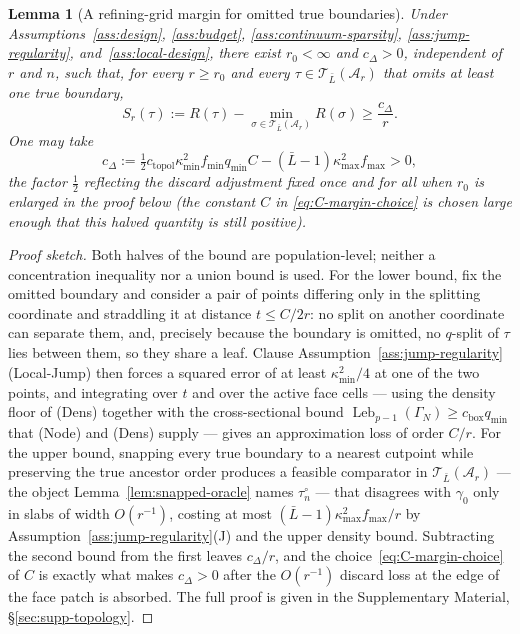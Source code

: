 \documentclass[11pt]{article}
\theoremstyle{plain}
\newtheorem{lemma}[theorem]{Lemma}
\theoremstyle{definition}
\theoremstyle{remark}
\newcommand{\cA}{\mathcal{A}}
\newcommand{\cT}{\mathcal{T}}
\begin{document}
\begin{lemma}[A refining-grid margin for omitted true boundaries]
\label{lem:topol-margin}
Under Assumptions~\ref{ass:design}, \ref{ass:budget},
\ref{ass:continuum-sparsity}, \ref{ass:jump-regularity},
and~\ref{ass:local-design}, there exist \(r_0<\infty\) and
\(c_\Delta>0\), independent of \(r\) and \(n\), such that, for every
\(r\ge r_0\) and every
\(\tau\in\cT_{\bar L}(\cA_r)\) that omits at least one true boundary,
\[
  S_r(\tau)
  :=
  R(\tau)
  -
  \min_{\sigma\in\cT_{\bar L}(\cA_r)}R(\sigma)
  \ge \frac{c_\Delta}{r}.
\]
One may take
\[
  c_\Delta
  :=
  \tfrac12
  c_{\mathrm{topol}}\kappa_{\min}^2f_{\min}q_{\min}C
  -
  (\bar L-1)\kappa_{\max}^2f_{\max}
  >0,
\]
the factor \(\tfrac12\) reflecting the discard adjustment fixed once and for
all when \(r_0\) is enlarged in the proof below (the constant \(C\) in
\eqref{eq:C-margin-choice} is chosen large enough that this halved quantity
is still positive).
\end{lemma}

\begin{proof}[Proof sketch]
Both halves of the bound are population-level; neither a concentration
inequality nor a union bound is used. For the lower bound, fix the omitted
boundary and consider a pair of points differing only in the splitting
coordinate and straddling it at distance $t\le C/2r$: no split on another
coordinate can separate them, and, precisely because the boundary is omitted,
no $q$-split of $\tau$ lies between them, so they share a leaf. Clause
Assumption~\ref{ass:jump-regularity}(Local-Jump) then forces a squared error of
at least $\kappa_{\min}^2/4$ at one
of the two points, and integrating over $t$ and over the active face cells ---
using the density floor of (Dens) together with the cross-sectional bound
$\operatorname{Leb}_{p-1}(\Gamma_N)\ge c_{\mathrm{box}}q_{\min}$ that (Node)
and (Dens) supply --- gives an approximation loss of order $C/r$. For the
upper bound, snapping every true boundary to a nearest cutpoint while
preserving the true ancestor order produces a feasible comparator in
$\cT_{\bar L}(\cA_r)$ --- the object
Lemma~\ref{lem:snapped-oracle} names $\tau_n^\circ$ --- that disagrees with
$\gamma_0$ only in slabs of width
$O(r^{-1})$, costing at most $(\bar L-1)\kappa_{\max}^2f_{\max}/r$ by
Assumption~\ref{ass:jump-regularity}(J) and
the upper density bound. Subtracting the second bound from the first leaves
$c_\Delta/r$, and the choice~\eqref{eq:C-margin-choice} of $C$ is exactly what
makes $c_\Delta>0$ after the $O(r^{-1})$ discard loss at the edge of the face
patch is absorbed. The full proof is given in the Supplementary Material,
\S\ref{sec:supp-topology}.
\end{proof}
\end{document}
